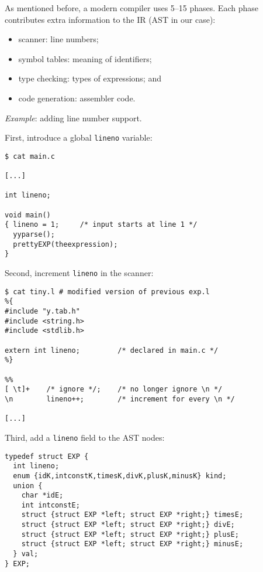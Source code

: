 \begin{slide*}
As mentioned before, a modern compiler uses 5--15 phases.
Each phase contributes extra information to the IR (AST in our case): 
\begin{itemize}
\item scanner: line numbers;
\item symbol tables: meaning of identifiers;
\item type checking: types of expressions; and
\item code generation: assembler code.
\end{itemize}

\vspace{0.1in}

{\em Example}: adding line number support.

\vspace{0.1in}

First, introduce a global {\tt lineno} variable:
\begin{scriptsize}
\begin{verbatim}
$ cat main.c

[...]

int lineno;
 
void main()
{ lineno = 1;     /* input starts at line 1 */
  yyparse();
  prettyEXP(theexpression);
}
\end{verbatim}
\end{scriptsize}
\vfil
\end{slide*}
 
\begin{slide*}
Second, increment {\tt lineno} in the scanner:
\begin{scriptsize}
\begin{verbatim}
$ cat tiny.l # modified version of previous exp.l
%{
#include "y.tab.h"
#include <string.h>
#include <stdlib.h>

extern int lineno;         /* declared in main.c */
%}

%%
[ \t]+    /* ignore */;    /* no longer ignore \n */
\n        lineno++;        /* increment for every \n */

[...]
\end{verbatim}
\end{scriptsize}

\vspace{0.1in}

Third, add a {\tt lineno} field to the AST nodes:
\begin{scriptsize}
\begin{verbatim}
typedef struct EXP {
  int lineno;
  enum {idK,intconstK,timesK,divK,plusK,minusK} kind;
  union {
    char *idE;
    int intconstE;
    struct {struct EXP *left; struct EXP *right;} timesE;
    struct {struct EXP *left; struct EXP *right;} divE;
    struct {struct EXP *left; struct EXP *right;} plusE;
    struct {struct EXP *left; struct EXP *right;} minusE;
  } val;
} EXP;
\end{verbatim}
\end{scriptsize}
 \vfil
\end{slide*}
 
